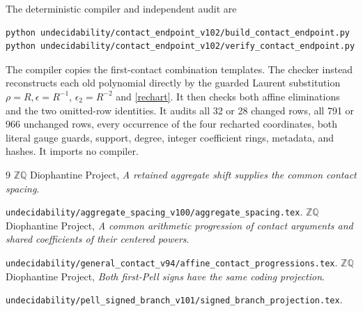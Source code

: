 \documentclass[11pt]{article}
\begin{document}
The deterministic compiler and independent audit are
\begin{verbatim}
python undecidability/contact_endpoint_v102/build_contact_endpoint.py
python undecidability/contact_endpoint_v102/verify_contact_endpoint.py
\end{verbatim}
The compiler copies the first-contact combination templates. The
checker instead reconstructs each old polynomial directly by the
guarded Laurent substitution \(\rho=R,\epsilon=R^{-1}\),
\(\epsilon_2=R^{-2}\) and \eqref{rechart}. It then checks both
affine eliminations and the two omitted-row identities. It audits
all 32 or 28 changed rows, all 791 or 966 unchanged rows, every
occurrence of the four recharted coordinates, both literal gauge
guards, support, degree, integer coefficient rings, metadata, and
hashes. It imports no compiler.

\begin{thebibliography}{9}
\small\setlength{\itemsep}{2pt}
 \(\mathbb Z\mathbb Q\) Diophantine Project,
\emph{A retained aggregate shift supplies the common contact spacing}.
\par\nolinkurl{undecidability/aggregate_spacing_v100/aggregate_spacing.tex}.
 \(\mathbb Z\mathbb Q\) Diophantine Project,
\emph{A common arithmetic progression of contact arguments and shared
coefficients of their centered powers}.
\par\nolinkurl{undecidability/general_contact_v94/affine_contact_progressions.tex}.
 \(\mathbb Z\mathbb Q\) Diophantine Project,
\emph{Both first-Pell signs have the same coding projection}.
\par\nolinkurl{undecidability/pell_signed_branch_v101/signed_branch_projection.tex}.
\end{thebibliography}
\end{document}
